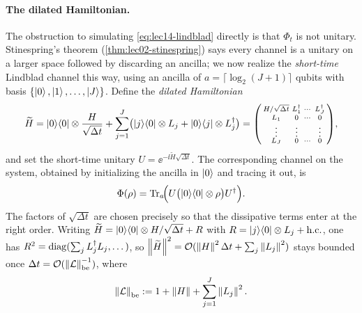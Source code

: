 \paragraph{The dilated Hamiltonian.}
The obstruction to simulating \eqref{eq:lec14-lindblad} directly is that $\Phi_t$ is not
unitary. Stinespring's theorem (\cref{thm:lec02-stinespring}) says every channel is a unitary on
a larger space followed by discarding an ancilla; we now realize the \emph{short-time}
Lindblad channel this way, using an ancilla of $a=\lceil\log_2(J+1)\rceil$ qubits with basis
$\{\ket0,\ket1,\dots,\ket J\}$. Define the \emph{dilated Hamiltonian}
\begin{equation}
  \widetilde H
  =\ket{0}\!\bra{0}\otimes\frac{H}{\sqrt{\Delta t}}
   +\sum_{j=1}^{J}\bigl(\ket j\!\bra0\otimes L_j+\ket0\!\bra j\otimes L_j^{\dagger}\bigr)
  =\begin{psmallmatrix}
     H/\sqrt{\Delta t} & L_1^{\dagger} & \cdots & L_J^{\dagger}\\
     L_1 & 0 & \cdots & 0\\
     \vdots & \vdots & & \vdots\\
     L_J & 0 & \cdots & 0
   \end{psmallmatrix},
  \label{eq:lec14-dilated}
\end{equation}
and set the short-time unitary $U=\ee^{-\ii\widetilde H\sqrt{\Delta t}}$. The corresponding
channel on the system, obtained by initializing the ancilla in $\ket0$ and tracing it out, is
\begin{equation}
  \Phi(\rho)=\operatorname{Tr}_a\!\Bigl(U\bigl(\ket{0}\!\bra{0}\otimes\rho\bigr)U^{\dagger}\Bigr).
  \label{eq:lec14-dilated-channel}
\end{equation}
The factors of $\sqrt{\Delta t}$ are chosen precisely so that the dissipative terms enter at the
right order. Writing $\widetilde H=\ket{0}\!\bra{0}\otimes H/\sqrt{\Delta t}+R$ with $R=\ket j\!\bra0
\otimes L_j+\mathrm{h.c.}$, one has $R^2=\mathrm{diag}(\sum_j L_j^{\dagger} L_j,\dots)$, so
$\left\lVert \widetilde H \right\rVert^2=\mathcal O(\left\lVert H \right\rVert^2\Delta t+\sum_j\left\lVert L_j \right\rVert^2)$ stays bounded once
$\Delta t=\mathcal O(\left\lVert \mathcal L \right\rVert_{\mathrm{be}}^{-1})$, where
\begin{equation}
  \left\lVert \mathcal L \right\rVert_{\mathrm{be}}:=1+\left\lVert H \right\rVert+\sum_{j=1}^{J}\left\lVert L_j \right\rVert^2.
  \label{eq:lec14-Lbe}
\end{equation}

